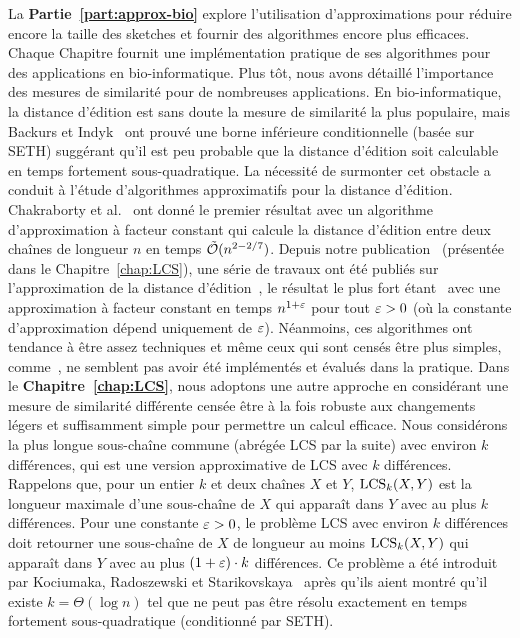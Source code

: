 La \textbf{Partie~\ref{part:approx-bio}} explore l'utilisation d'approximations pour réduire encore la taille des sketches et fournir des algorithmes encore plus efficaces. Chaque Chapitre fournit une implémentation pratique de ses algorithmes pour des applications en bio-informatique.
%
Plus tôt, nous avons détaillé l'importance des mesures de similarité pour de nombreuses applications.
%
En bio-informatique, la distance d'édition est sans doute la mesure de similarité la plus populaire, mais Backurs et Indyk~\cite{DBLP:conf/stoc/BackursI15} ont prouvé une borne inférieure conditionnelle (basée sur SETH) suggérant qu'il est peu probable que la distance d'édition soit calculable en temps fortement sous-quadratique.
%
La nécessité de surmonter cet obstacle a conduit à l'étude d'algorithmes approximatifs pour la distance d'édition. Chakraborty et al.~\cite{DBLP:conf/focs/ChakrabortyDGKS18} ont donné le premier résultat avec un algorithme d'approximation à facteur constant qui calcule la distance d'édition entre deux chaînes de longueur $n$ en temps $\tilde{\mathcal{O}}(n^{2-2/7})$.
Depuis notre publication~\cite{DBLP:conf/cpm/GourdelKRS20} (présentée dans le Chapitre~\ref{chap:LCS}), une série de travaux ont été publiés sur l'approximation de la distance d'édition~\cite{brakensiek2020constant,koucky2020constant}, le résultat le plus fort étant~\cite{andoni2020edit} avec une approximation à facteur constant en temps $n^{1+\varepsilon}$ pour tout $\varepsilon>0$ (où la constante d'approximation dépend uniquement de $\varepsilon$).
Néanmoins, ces algorithmes ont tendance à être assez techniques et même ceux qui sont censés être plus simples, comme~\cite{andoni2020simple}, ne semblent pas avoir été implémentés et évalués dans la pratique.
%
Dans le \textbf{Chapitre~\ref{chap:LCS}}, nous adoptons une autre approche en considérant une mesure de similarité différente censée être à la fois robuste aux changements légers et suffisamment simple pour permettre un calcul efficace. Nous considérons la plus longue sous-chaîne commune (abrégée LCS par la suite) avec environ $k$ différences, qui est une version approximative de LCS avec $k$ différences. Rappelons que, pour un entier $k$ et deux chaînes $X$ et $Y$, $\mathrm{LCS}_{k}(X,Y)$ est la longueur maximale d'une sous-chaîne de $X$ qui apparaît dans $Y$ avec au plus $k$ différences.
Pour une constante $\varepsilon > 0$, le problème LCS avec environ $k$ différences doit retourner une sous-chaîne de $X$ de longueur au moins $\mathrm{LCS}_{k}(X,Y)$ qui apparaît dans $Y$ avec au plus $(1+\varepsilon) \cdot k$ différences. Ce problème a été introduit par Kociumaka, Radoszewski et Starikovskaya~\cite{DBLP:journals/algorithmica/KociumakaRS19} après qu'ils aient montré qu'il existe $k=\Theta(\log n)$ tel que \kLCS ne peut pas être résolu exactement en temps fortement sous-quadratique (conditionné par SETH).
